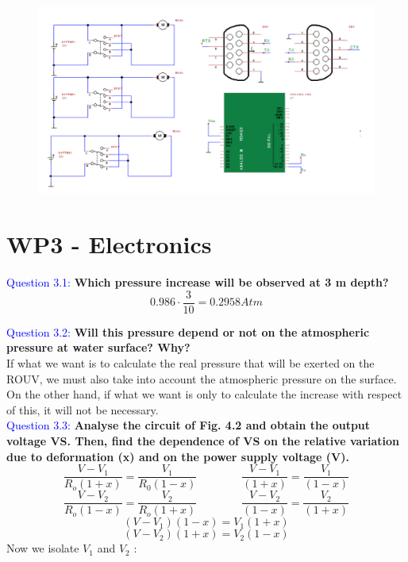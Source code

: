 \documentclass[12pt, a4papre]{article}
\begin{document}
	\begin{figure}[H]
		\begin{center}
		\includegraphics[width=150mm]{Cirquit2WP2.png}
		\end{center}
	\end{figure}
	
	\newpage
	\section{WP3 - Electronics}

	\textcolor{blue}{Question 3.1:} \textbf{Which pressure increase will be observed at 3 m depth?}
	\[
		0.986\cdot\frac{3}{10} = 0.2958 Atm
	\]

	\textcolor{blue}{Question 3.2:} \textbf{Will this pressure depend or not on the atmospheric pressure at water surface? Why?}\\
	
		If what we want is to calculate the real pressure that will be exerted on the ROUV, we must also take into account the atmospheric pressure on the surface. On the other hand, if what we want is only to calculate the increase with respect of this, it will not be necessary.\\
	
	\textcolor{blue}{Question 3.3:} \textbf{Analyse the circuit of Fig. 4.2 and obtain the output voltage VS. Then, find the dependence of VS on the relative variation due to deformation (x) and on the power supply voltage (V). }
	\[
	\frac{V-V_{1}}{R_{o}( 1+x)} =\frac{V_{1}}{R_{0}( 1-x)} \qquad \qquad \frac{V-V_{1}}{( 1+x)} =\frac{V_{1}}{( 1-x)} 
	\]\[
	\frac{V-V_{2}}{R_{o}( 1-x)} =\frac{V_{2}}{R_{o}( 1+x)}\qquad \qquad \frac{V-V_{2}}{( 1-x)} =\frac{V_{2}}{( 1+x)} 
	\]\[
	( V-V_{1})( 1-x) =V_{1}( 1+x)
	\]\[
	( V-V_{2})( 1+x) =V_{2}( 1-x)
	\]
	Now we isolate $V_{1}$ and $V_{2}$ :
	
\end{document}

